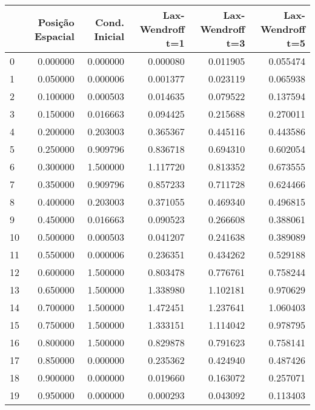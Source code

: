 \begin{tabular}{lrrrrr}
\toprule
 & Posição Espacial & Cond. Inicial & Lax-Wendroff t=1 & Lax-Wendroff t=3 & Lax-Wendroff t=5 \\
\midrule
0 & 0.000000 & 0.000000 & 0.000080 & 0.011905 & 0.055474 \\
1 & 0.050000 & 0.000006 & 0.001377 & 0.023119 & 0.065938 \\
2 & 0.100000 & 0.000503 & 0.014635 & 0.079522 & 0.137594 \\
3 & 0.150000 & 0.016663 & 0.094425 & 0.215688 & 0.270011 \\
4 & 0.200000 & 0.203003 & 0.365367 & 0.445116 & 0.443586 \\
5 & 0.250000 & 0.909796 & 0.836718 & 0.694310 & 0.602054 \\
6 & 0.300000 & 1.500000 & 1.117720 & 0.813352 & 0.673555 \\
7 & 0.350000 & 0.909796 & 0.857233 & 0.711728 & 0.624466 \\
8 & 0.400000 & 0.203003 & 0.371055 & 0.469340 & 0.496815 \\
9 & 0.450000 & 0.016663 & 0.090523 & 0.266608 & 0.388061 \\
10 & 0.500000 & 0.000503 & 0.041207 & 0.241638 & 0.389089 \\
11 & 0.550000 & 0.000006 & 0.236351 & 0.434262 & 0.529188 \\
12 & 0.600000 & 1.500000 & 0.803478 & 0.776761 & 0.758244 \\
13 & 0.650000 & 1.500000 & 1.338980 & 1.102181 & 0.970629 \\
14 & 0.700000 & 1.500000 & 1.472451 & 1.237641 & 1.060403 \\
15 & 0.750000 & 1.500000 & 1.333151 & 1.114042 & 0.978795 \\
16 & 0.800000 & 1.500000 & 0.829878 & 0.791623 & 0.758141 \\
17 & 0.850000 & 0.000000 & 0.235362 & 0.424940 & 0.487426 \\
18 & 0.900000 & 0.000000 & 0.019660 & 0.163072 & 0.257071 \\
19 & 0.950000 & 0.000000 & 0.000293 & 0.043092 & 0.113403 \\
\bottomrule
\end{tabular}
